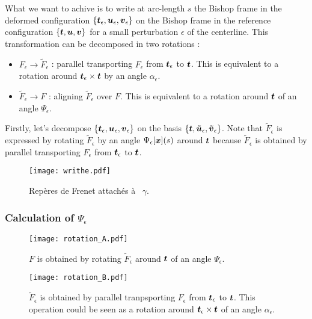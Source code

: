 What we want to achive is to write at arc-length $s$ the Bishop frame in the deformed configuration $\{\boldsymbol{t}_\epsilon, \boldsymbol{u}_\epsilon,\boldsymbol{v}_\epsilon\}$ on the Bishop frame in the reference configuration $\{\boldsymbol{t}, \boldsymbol{u},\boldsymbol{v}\}$ for a small perturbation $\epsilon$ of the centerline. This transformation can be decomposed in two rotations :

\begin{itemize}
\item
$F_\epsilon \rightarrow \tilde{F}_\epsilon$ : parallel transporting $F_\epsilon$ from $\boldsymbol{t}_\epsilon$ to $\boldsymbol{t}$. 
This is equivalent to a rotation around $\boldsymbol{t}_\epsilon \times \boldsymbol{t}$ by an angle $\alpha_\epsilon$.
\item 
$\tilde{F}_\epsilon \rightarrow F$ : aligning $\tilde{F}_\epsilon$ over $F$. 
This is equivalent to a rotation around $\boldsymbol{t}$ of an angle $\Psi_\epsilon$.
\end{itemize}

Firstly, let's decompose $\{\boldsymbol{t}_\epsilon, \boldsymbol{u}_\epsilon,\boldsymbol{v}_\epsilon\}$ on the basis $\{\boldsymbol{t}, \boldsymbol{\tilde{u}}_\epsilon,\boldsymbol{\tilde{v}}_\epsilon\}$. Note that $\tilde{F}_\epsilon$ is expressed by rotating $\tilde{F}_\epsilon$ by an angle $\Psi_\epsilon[\boldsymbol{x}](s)$ around $\boldsymbol{t}$ because $\tilde{F}_\epsilon$ is obtained by parallel transporting $F_\epsilon$ from $\boldsymbol{t}_\epsilon$ to $\boldsymbol{t}$.

\begin{figure}[t]
\centering
\texttt{[image: writhe.pdf]}
\caption{Repères de Frenet attachés à  $\gamma$.}
\label{fig:1_1}
\end{figure}

\subsubsection{Calculation of $\Psi_\epsilon$}

\begin{figure}[p]
\centering
\texttt{[image: rotation\_A.pdf]}
\caption{$F$ is obtained by rotating $\tilde{F}_\epsilon$ around $\boldsymbol{t}$ of an angle $\Psi_\epsilon$.}
\texttt{[image: rotation\_B.pdf]}
\caption{$\tilde{F}_\epsilon$ is obtained by parallel tranpsporting $F_\epsilon$ from $\boldsymbol{t}_\epsilon$ to $\boldsymbol{t}$. This operation could be seen as a rotation around $\boldsymbol{t}_\epsilon \times \boldsymbol{t}$ of an angle $\alpha_\epsilon$.}
\label{A}
\end{figure}

